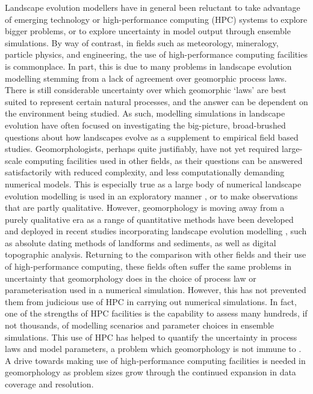 Landscape evolution modellers have in general been reluctant to take advantage of emerging technology or high-performance computing (HPC) systems to explore bigger problems, or to explore uncertainty in model output through ensemble simulations. By way of contrast, in fields such as meteorology, mineralogy, particle physics, and engineering, the use of high-performance computing facilities is commonplace. In part, this is due to many problems in landscape evolution modelling stemming from a lack of agreement over geomorphic process laws. There is still considerable uncertainty over which geomorphic `laws' are best suited to represent certain natural processes, and the answer can be dependent on the environment being studied. As such, modelling simulations in landscape evolution have often focused on investigating the big-picture, broad-brushed questions about how landscapes evolve as a supplement to empirical field based studies. Geomorphologists, perhaps quite justifiably, have not yet required large-scale computing facilities used in other fields, as their questions can be answered satisfactorily with reduced complexity, and less computationally demanding numerical models. This is especially true as a large body of numerical landscape evolution modelling is used in an exploratory manner \citep{hancock2003effect,lancaster2003you,Tucker2010}, or to make observations that are partly qualitative. However, geomorphology is moving away from a purely qualitative era as a range of quantitative methods have been developed and deployed in recent studies incorporating landscape evolution modelling \citep[e.g.][]{Attal2011a,mudd2017detection}, such as absolute dating methods of landforms and sediments, as well as digital topographic analysis. Returning to the comparison with other fields and their use of high-performance computing, these fields often suffer the same problems in uncertainty that geomorphology does in the choice of process law or parameterisation used in a numerical simulation. However, this has not prevented them from judicious use of HPC in carrying out numerical simulations. In fact, one of the strengths of HPC facilities is the capability to assess many hundreds, if not thousands, of modelling scenarios and parameter choices in ensemble simulations. This use of HPC has helped to quantify the uncertainty in process laws and model parameters, a problem which geomorphology is not immune to \citep{Tucker2010,pelletier2015forecasting}. A drive towards making use of high-performance computing facilities is needed in geomorphology as problem sizes grow through the continued expansion in data coverage and resolution.

